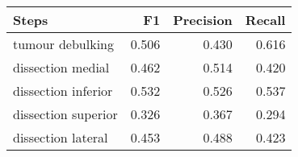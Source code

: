 \begin{tabular}{lrrr}
\toprule
Steps & F1 & Precision & Recall \\
\midrule
tumour debulking & 0.506 & 0.430 & 0.616 \\
dissection medial & 0.462 & 0.514 & 0.420 \\
dissection inferior & 0.532 & 0.526 & 0.537 \\
dissection superior & 0.326 & 0.367 & 0.294 \\
dissection lateral & 0.453 & 0.488 & 0.423 \\
\bottomrule
\end{tabular}

